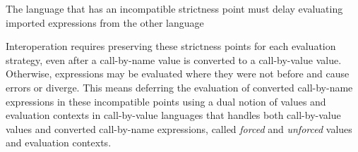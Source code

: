 The language that has an incompatible strictness point must delay evaluating imported expressions from the other language

Interoperation requires preserving these strictness points for each evaluation strategy, even after a call-by-name value is converted to a call-by-value value. Otherwise, expressions may be evaluated where they were not before and cause errors or diverge. This means deferring the evaluation of converted call-by-name expressions in these incompatible points using a dual notion of values and evaluation contexts in call-by-value languages that handles both call-by-value values and converted call-by-name expressions, called \emph{forced} and \emph{unforced} values and evaluation contexts.
